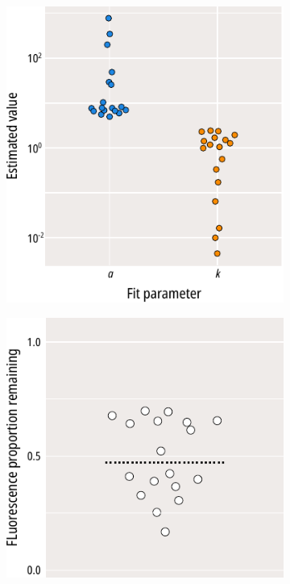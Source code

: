 \begin{figure}[h]
\begin{subfigure}[t]{0.45\textwidth}
		\includegraphics[width=\textwidth]{bleaching_terms_3.pdf}
	\end{subfigure}
	\hfill
	\begin{subfigure}[t]{0.45\textwidth}
		\caption{}\label{ch3fig:bleaching_terms_4}
		\centering
		\includegraphics[width=\textwidth]{bleaching_terms_4.pdf}

\end{subfigure}
\end{figure}
